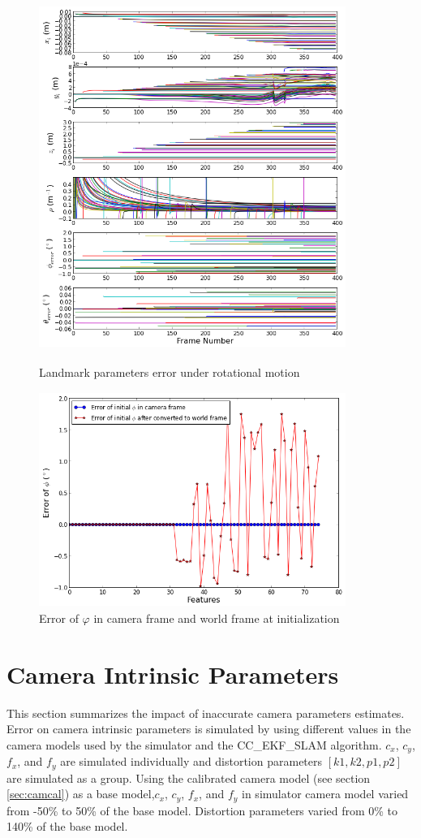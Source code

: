 \begin{figure}[h]
  \centering
  \includegraphics[width=10cm, height=12cm]{./Figures/SimulationFigures/Figure25.png}
  \caption{Landmark parameters error under rotational motion}
  \label{fig:simfig25}
\end{figure}

\begin{figure}[h] %
  \centering
  \includegraphics[width=10cm, height=7cm]{./Figures/SimulationFigures/Figure26.png}
  \caption{Error of $\varphi$ in camera frame and world frame at initialization}
  \label{fig:simfig26}
\end{figure}
\FloatBarrier

\section{Camera Intrinsic Parameters}
This section summarizes the impact of inaccurate camera parameters estimates. Error on camera intrinsic parameters is simulated by using different values in the camera models used by the simulator and the CC\_EKF\_SLAM algorithm. $c_{x}$, $c_{y}$, $f_{x}$, and $f_{y}$ are simulated individually and distortion parameters $[k1, k2, p1, p2]$ are simulated as a group. Using the calibrated camera model (see section \ref{sec:camcal}) as a base model,$ c_{x}$, $c_{y}$, $f_{x} $, and $f_{y}$ in simulator camera model varied from -50\% to 50\% of the base model. Distortion parameters varied from 0\% to 140\% of the base model.

